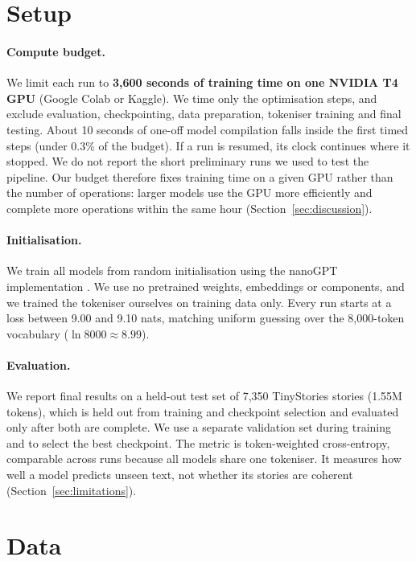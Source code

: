 \documentclass[12pt]{article}
\begin{document}
\section{Setup}

\paragraph{Compute budget.} We limit each run to \textbf{3,600 seconds of training time on one NVIDIA T4 GPU} (Google Colab or Kaggle). We time only the optimisation steps, and exclude evaluation, checkpointing, data preparation, tokeniser training and final testing. About 10 seconds of one-off model compilation falls inside the first timed steps (under 0.3\% of the budget). If a run is resumed, its clock continues where it stopped. We do not report the short preliminary runs we used to test the pipeline. Our budget therefore fixes training time on a given GPU rather than the number of operations: larger models use the GPU more efficiently and complete more operations within the same hour (Section~\ref{sec:discussion}).
 
\paragraph{Initialisation.} We train all models from random initialisation using the nanoGPT implementation \citep{karpathy2022nanogpt}. We use no pretrained weights, embeddings or components, and we trained the tokeniser ourselves on training data only. Every run starts at a loss between 9.00 and 9.10 nats, matching uniform guessing over the 8,000-token vocabulary ($\ln 8000 \approx 8.99$).
 
\paragraph{Evaluation.} We report final results on a held-out test set of 7,350 TinyStories stories (1.55M tokens), which is held out from training and checkpoint selection and evaluated only after both are complete. We use a separate validation set during training and to select the best checkpoint. The metric is token-weighted cross-entropy, comparable across runs because all models share one tokeniser. It measures how well a model predicts unseen text, not whether its stories are coherent (Section~\ref{sec:limitations}).

\section{Data}
\label{sec:data}
\end{document}
